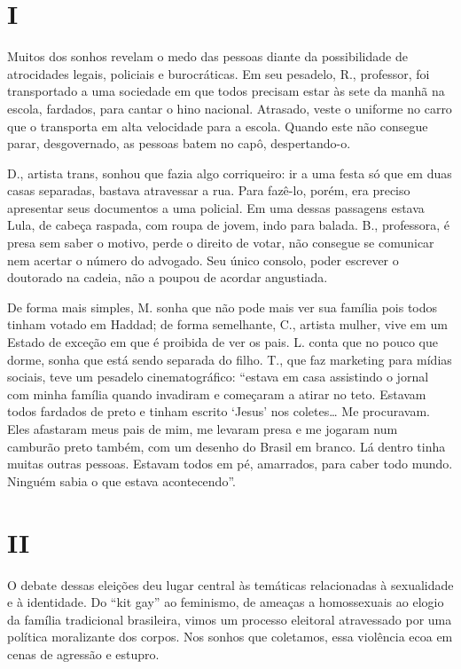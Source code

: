 \section*{I}

Muitos dos sonhos revelam o medo das pessoas diante da possibilidade de
atrocidades legais, policiais e burocráticas. Em seu pesadelo, R.,
professor, foi transportado a uma sociedade em que todos precisam estar
às sete da manhã na escola, fardados, para cantar o hino nacional.
Atrasado, veste o uniforme no carro que o transporta em alta velocidade
para a escola. Quando este não consegue parar, desgovernado, as pessoas
batem no capô, despertando-o.

D., artista trans, sonhou que fazia algo corriqueiro: ir a uma festa só
que em duas casas separadas, bastava atravessar a rua. Para fazê-lo,
porém, era preciso apresentar seus documentos a uma policial. Em uma
dessas passagens estava Lula, de cabeça raspada, com roupa de jovem,
indo para balada. B., professora, é presa sem saber o motivo, perde o
direito de votar, não consegue se comunicar nem acertar o número do
advogado. Seu único consolo, poder escrever o doutorado na cadeia, não a
poupou de acordar angustiada.

De forma mais simples, M. sonha que não pode mais ver sua família pois
todos tinham votado em Haddad; de forma semelhante, C., artista mulher,
vive em um Estado de exceção em que é proibida de ver os pais. L. conta
que no pouco que dorme, sonha que está sendo separada do filho. T., que
faz marketing para mídias sociais, teve um pesadelo cinematográfico:
``estava em casa assistindo o jornal com minha família quando invadiram
e começaram a atirar no teto. Estavam todos fardados de preto e tinham
escrito `Jesus' nos coletes\ldots{} Me procuravam. Eles afastaram meus
pais de mim, me levaram presa e me jogaram num camburão preto também,
com um desenho do Brasil em branco. Lá dentro tinha muitas outras
pessoas. Estavam todos em pé, amarrados, para caber todo mundo. Ninguém
sabia o que estava acontecendo''.

\section*{II}

O debate dessas eleições deu lugar central às temáticas relacionadas à
sexualidade e à identidade. Do ``kit gay'' ao feminismo, de ameaças a
homossexuais ao elogio da família tradicional brasileira, vimos um
processo eleitoral atravessado por uma política moralizante dos corpos.
Nos sonhos que coletamos, essa violência ecoa em cenas de agressão e
estupro.

